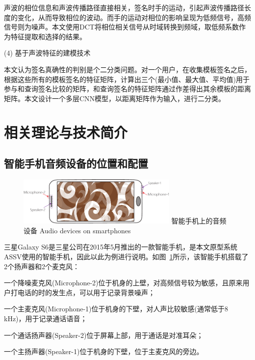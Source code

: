 声波的相位信息和声波传播路径直接相关，签名时手的运动，引起声波传播路径长度的变化，从而导致相位的波动。而手的运动对相位的影响呈现为低频信号，高频信号则为噪声。本文使用DCT将相位相关信号从时域转换到频域，取低频系数作为特征提取和选择的结果。

(4) 基于声波特征的建模技术

本文认为签名真确性的判别是个二分类问题。对一个用户，在收集模板签名之后，根据这些所有的模板签名的特征矩阵，计算出三个(最小值、最大值、平均值)用于参与和查询签名比较的矩阵，和查询签名的特征矩阵通过作差得出其余模板的距离矩阵。本文设计一个多层CNN模型，以距离矩阵作为输入，进行二分类。

\section{相关理论与技术简介}

\subsection{智能手机音频设备的位置和配置}
\begin{figure}[!htp]
  \centering
  \includegraphics[width=0.7\textwidth]{figure/smartphone.pdf}
  \bicaption
    {智能手机上的音频设备}
    {Audio devices on smartphones}
  \label{fig:audio-device-smartphone}
\end{figure}

三星Galaxy S6是三星公司在2015年5月推出的一款智能手机，是本文原型系统ASSV使用的智能手机，因此以此为例进行说明。如图~\ref{fig:audio-device-smartphone}所示，该智能手机搭载了2个扬声器和2个麦克风：
\begin{enumerate*}[label=\alph*)]
    \item 一个降噪麦克风(Microphone-2)位于机身的上壁，对高频信号较为敏感，且原来用户打电话的时的发生点，可以用于记录背景噪声；
    \item 一个主麦克风(Microphone-1)位于机身的下壁，对人声比较敏感(通常低于8 kHz)，用于记录通话语音；
    \item 一个通话扬声器(Speaker-2)位于屏幕上部，用于通话是对准耳朵；
    \item 一个主扬声器(Speaker-1)位于机身的下壁，位于主麦克风的旁边。
\end{enumerate*}

